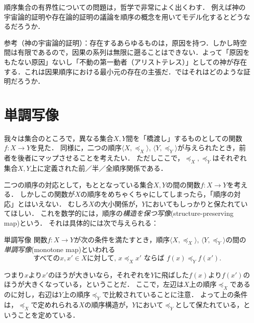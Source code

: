 \documentclass[dvipdfmx,11pt,a4paper]{jsarticle}
\begin{document}

\begin{rei}{}{}
順序集合の有界性についての問題は，哲学で非常によく出くわす．
例えば神の宇宙論的証明や存在論的証明の議論を順序の概念を用いてモデル化するとどうなるだろうか．

参考（神の宇宙論的証明）：存在するあらゆるものは，原因を持つ．しかし時空間は有限であるので，因果の系列は無限に遡ることはできない．よって「原因をもたない原因」ないし「不動の第一動者（アリストテレス）」としての神が存在する．これは因果順序における最小元の存在の主張だ．ではそれはどのような証明だろうか．
\end{rei}


\section{単調写像}
我々は集合のところで，異なる集合$X, Y$間を「橋渡し」するものとしての関数$f:X \to Y$を見た．
同様に，二つの順序$\langle X, \preceq_X \rangle$, $\langle Y, \preceq_Y \rangle$が与えられたとき，前者を後者にマップさせることを考えたい．
ただしここで，$\preceq_X, \preceq_Y$はそれぞれ集合$X,Y$上に定義された前／半／全順序関係である．

二つの順序の対応として，もととなっている集合$X, Y$の間の関数$f:X \to Y$を考える．
しかしこの関数が$X$の順序をめちゃくちゃにしてしまったら，「順序の対応」とはいえない．
むしろ$X$の大小関係が，$Y$においてもしっかりと保たれていてほしい．
これを数学的には，順序の\emph{構造を保つ写像}(structure-preserving map)という．
それは具体的には次で与えられる：
\begin{dfn}{単調写像}{}
関数$f:X \to Y$が次の条件を満たすとき，順序$\langle X, \preceq_X \rangle$, $\langle Y, \preceq_Y \rangle$の間の\emph{単調写像}(monotone map)といわれる
\[
 \text{すべての}x, x' \in X \text{に対して, }  x \preceq_X x' \text{ ならば } f(x) \preceq_Y f(x').
\]
\end{dfn}
つまり$x$より$x'$のほうが大きいなら，それぞれを$Y$に飛ばした$f(x)$より$f(x')$のほうが大きくなっている，ということだ．
ここで，左辺は$X$上の順序$\preceq_X$であるのに対し，右辺は$Y$上の順序$\preceq_Y$で比較されていることに注意．
よって上の条件は，$\preceq_X$で定めれられる$X$の順序構造が，$Y$において$\preceq_Y$として保たれている，ということを定めている．
\end{document}
